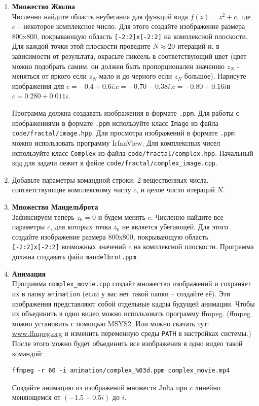 \documentclass{article}
\begin{document}
\begin{enumerate}
\item \textbf{Множество Жюлиа} \\
Численно найдите область неубегания для функций вида $f(z) = z^2 + c$, где $c$ -- некоторое комплексное число. Для этого создайте изображение размера 800x800, покрывающую область \texttt{[-2:2]x[-2:2]} на комплексной плоскости. Для каждой точки этой плоскости проведите $N \approx 20$ итераций и, в зависимости от результата, окрасьте пиксель в соответствующий цвет (цвет можно подобрать самим, он должен быть пропорционален значению $z_N$ - меняться от яркого если $z_N$ мало и до черного если $z_N$ большое). Нарисуте изображения для $c = -0.4 + 0.6i$;\quad $c = -0.70 - 0.38i$;\quad $c = -0.80 + 0.16i$\quad  и\quad $c = 0.280 + 0.011i$.

Программа должна создавать изображения в формате \texttt{.ppm}. Для работы с изображениями в формате \texttt{.ppm} используйте класс \texttt{Image} из файла \texttt{code/fractal/image.hpp}. Для просмотра изображений в формате \texttt{.ppm} можно использовать программу IrfanView. Для комплексных чисел используйте класс \texttt{Complex} из файла \texttt{code/fractal/complex.hpp}. 
Начальный код для задачи лежит в файле \texttt{code/fractal/complex\_image.cpp}.

\item Добавьте параметры командной строки: 2 вещественных числа, соответствующие комплексному числу $c$, и целое число итераций $N$. 
\item \textbf{Множество Мандельброта} \\
Зафиксируем теперь $z_0 = 0$ и будем менять $c$. Численно найдите все параметры $c$, для которых точка $z_0$ не является убегающей. Для этого создайте изображение размера 800x800, покрывающую область \texttt{[-2:2]x[-2:2]} возможных значений $c$ на комплексной плоскости. Программа должна создавать файл \texttt{mandelbrot.ppm}.

\item \textbf{Анимация} \\
Программа \texttt{complex\_movie.cpp} создаёт множество изображений и сохраняет их в папку \texttt{animation} (если у вас нет такой папки -- создайте её). Эти изображения представляют собой отдельные кадры будущей анимации. Чтобы их объединить в одно видео можно использовать программу ffmpeg. (ffmpeg можно установить с помощью MSYS2. Или можно скачать тут: \href{https://www.ffmpeg.org/}{www.ffmpeg.org} и изменить переменную среды \texttt{PATH} в настройках системы.) После этого можно будет объединить все изображения в одно видео такой командой:
\begin{verbatim}
ffmpeg -r 60 -i animation/complex_%03d.ppm complex_movie.mp4
\end{verbatim}
Создайте анимацию из изображений множеств Julia при $c$ линейно меняющемся от $(-1.5 - 0.5i)$ до $i$.
\end{enumerate}
\end{document}
